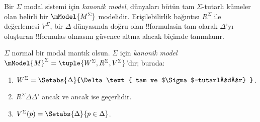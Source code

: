 



Bir $\Sigma$ modal sistemi için \emph{kanonik model}, dünyaları bütün tam
$\Sigma$-tutarlı kümeler olan belirli bir $\mModel{M^\Sigma}$ modelidir.
Erişilebilirlik bağıntısı $R^\Sigma$ ile değerlemesi $V^\Sigma$, bir
$\Delta$ dünyasında doğru olan !!{formula}s{}in tam olarak $\Delta$'yı
oluşturan !!{formula}s olmasını güvence altına alacak biçimde tanımlanır.

\begin{defn}
  $\Sigma$ normal bir modal mantık olsun. $\Sigma$ için \emph{kanonik model}
  $\mModel{M}^\Sigma=\tuple{W^\Sigma,R^\Sigma,V^\Sigma}$'dır; burada:
  \begin{enumerate}
  \item $W^\Sigma = \Setabs{ \Delta }{\Delta \text{
      tam ve $\Sigma$-tutarlıdır} }$.
  \item $R^\Sigma\Delta\Delta'$ ancak ve ancak
     ise geçerlidir.
  \item $V^\Sigma(p)=\Setabs{\Delta}{p\in\Delta}$.
  \end{enumerate}
\end{defn}


